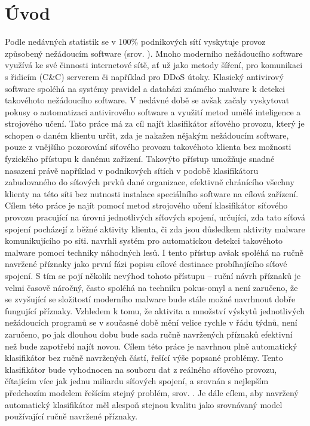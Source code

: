 \chapter*{Úvod}

Podle nedávných statistik se v 100\% podnikových sítí vyskytuje provoz způsobený nežádoucím software (srov. \cite{_cisco_2014}). Mnoho moderního nežádoucího software využívá ke své činnosti internetové sítě, ať už jako metody šíření, pro komunikaci s řidicím (C\&C) serverem či například pro DDoS útoky. Klasický antivirový software spoléhá na systémy pravidel a databázi známého malware k detekci takovéhoto nežádoucího software. V nedávné době se avšak začaly vyskytovat pokusy o automatizaci antivirového software a využití metod umělé inteligence a strojového učení. Tato práce má za cíl najít klasifikátor síťového provozu, který je schopen o daném klientu určit, zda je nakažen nějakým nežádoucím software, pouze z vnějšího pozorování síťového provozu takovéhoto klienta bez možnosti fyzického přístupu k danému zařízení. Takovýto přístup umožňuje snadné nasazení právě například v podnikových sítích v podobě klasifikátoru zabudovaného do síťových prvků dané organizace, efektivně chránícího všechny klienty na této síti bez nutnosti instalace speciálního software na cílová zařízení. Cílem této práce je najít pomocí metod strojového učení klasifikátor síťového provozu pracující na úrovni jednotlivých síťových spojení, určující, zda tato síťová spojení pocházejí z běžné aktivity klienta, či zda jsou důsledkem aktivity malware komunikujícího po síti. \cite{machlica_learning_2017} navrhli systém pro automatickou detekci takovéhoto malware pomocí techniky náhodných lesů. I tento přístup avšak spoléhá na ručně navržené příznaky jako první fázi popisu cílové destinace probíhajícího síťové spojení. S tím se pojí několik nevýhod tohoto přístupu -- ruční návrh příznaků je velmi časově náročný, často spoléhá na techniku pokus-omyl a není zaručeno, že se zvyšující se složitostí moderního malware bude stále možné navrhnout dobře fungující příznaky. Vzhledem k tomu, že aktivita a množství výskytů jednotlivých nežádoucích programů se v současné době mění velice rychle v řádu týdnů, není zaručeno, po jak dlouhou dobu bude sada ručně navržených příznaků efektivní než bude zapotřebí najít novou. Cílem této práce je navrhnou plně automatický klasifikátor bez ručně navržených částí, řešící výše popsané problémy. Tento klasifikátor bude vyhodnocen na souboru dat z reálného síťového provozu, čítajícím více jak jednu miliardu síťových spojení, a srovnán s nejlepším předchozím modelem řešícím stejný problém, srov. \cite{machlica_learning_2017}. Je dále cílem, aby navržený automatický klasifikátor měl alespoň stejnou kvalitu jako srovnávaný model používající ručně navržené příznaky.

